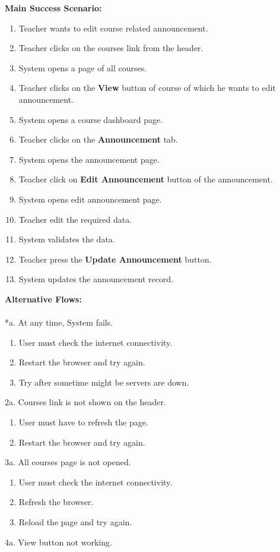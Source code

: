 \textbf{Main Success Scenario:}
\begin{enumerate}
\item Teacher wants to edit course related announcement.
\item Teacher clicks on the courses link from the header.
\item System opens a page of all courses.
\item Teacher clicks on the \textbf{View} button of course of which he wants to edit announcement.
\item System opens a course dashboard page.
\item Teacher clicks on the \textbf{Announcement} tab.
\item System opens the announcement page.
\item Teacher click on \textbf{Edit Announcement} button of the announcement.
\item System opens edit announcement page.
\item Teacher edit the required data.
\item System validates the data.
\item Teacher press the \textbf{Update Announcement} button.
\item System updates the announcement record.
\end{enumerate}
\textbf{Alternative Flows:}\\
\\
*a. At any time, System fails.
\begin{enumerate}
\item User must check the internet connectivity.
\item Restart the browser and try again.
\item Try after sometime might be servers are down.
\end{enumerate}
2a. Courses link is not shown on the header.
\begin{enumerate}
\item User must have to refresh the page.
\item Restart the browser and try again.
\end{enumerate} 
3a. All courses page is not opened.
\begin{enumerate}
\item User must check the internet connectivity.
\item Refresh the browser.
\item Reload the page and try again.
\end{enumerate}
4a. View button not working.
